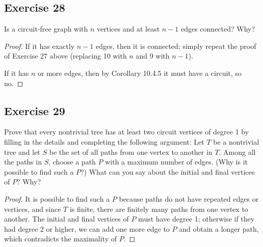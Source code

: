 \documentclass[14pt]{extarticle}
\begin{document}
\subsection{Exercise 28}
Is a circuit-free graph with \(n\) vertices and at least \(n - 1\) edges connected? Why?

\begin{proof}
    If it has exactly \(n-1\) edges, then it is connected: simply repeat the proof of Exercise 27 above (replacing 10 with \(n\)
    and 9 with \(n-1\)).

    If it has \(n\) or more edges, then by Corollary 10.4.5 it must have a circuit, so no.
\end{proof}

\subsection{Exercise 29}
Prove that every nontrivial tree has at least two circuit vertices of degree 1 by filling in the details and completing
the following argument: Let \(T\) be a nontrivial tree and let \(S\) be the set of all paths from one vertex to another in
\(T\). Among all the paths in \(S\), choose a path \(P\) with a maximum number of edges. (Why is it possible to find such a
\(P\)?) What can you say about the initial and final vertices of \(P\)? Why?

\begin{proof}
    It is possible to find such a \(P\) because paths do not have repeated edges or vertices, and since \(T\) is finite, there
    are finitely many paths from one vertex to another. The initial and final vertices of \(P\) must have degree 1;
    otherwise if they had degree 2 or higher, we can add one more edge to \(P\) and obtain a longer path, which contradicts the
    maximality of \(P\).
\end{proof}
\end{document}
